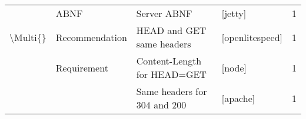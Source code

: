 \begin{tabular}{llllr}
         & ABNF & Server ABNF &                                                                         [jetty] &        1 \\
\textbackslash Multi\{\} & Recommendation & HEAD and GET same headers &                                                                 [openlitespeed] &        1 \\
         & Requirement & Content-Length for HEAD=GET &                                                                          [node] &        1 \\
         &             & Same headers for 304 and 200 &                                                                        [apache] &        1 \\
\bottomrule
\end{tabular}
